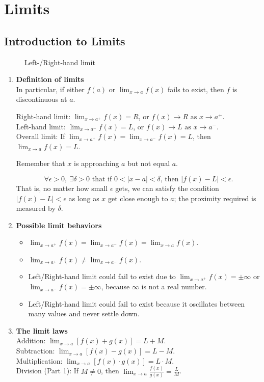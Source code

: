%
\chapter{Limits}
\section{Introduction to Limits}
\begin{figure}[H]
  \centering
  \caption{Left-/Right-hand limit}
\end{figure}
\begin{enumerate}
  \item \textbf{Definition of limits}\\
    \indent In particular, if either \(f(a)\) or \(\lim_{x\to a} f(x)\) fails to exist, then \(f\) is discontinuous at \(a\).\par
    \indent Right-hand limit: \(\lim_{x\to a^+}f(x)=R\), or \(f(x)\to R\text{ as }x\to a^+\).\\
    \indent Left-hand limit: \(\lim_{x\to a^-}f(x)=L\), or \(f(x)\to L\text{ as }x\to a^-\).\\
    \indent Overall limit: If \(\lim_{x\to a^+}f(x)=\lim_{x\to a^-}f(x)=L\), then \(\lim_{x\to a}f(x)=L\).\par
    Remember that \(x\) is approaching \(a\) but not equal \(a\).
    \begin{definition}
    \[
      \forall\epsilon>0,\ \exists\delta>0\text{ that if }0<\lvert x-a\rvert<\delta\text{, then }\lvert f(x)-L\rvert<\epsilon.
    \]
    That is, no matter how small \(\epsilon\) gets, we can satisfy the condition \(\lvert f(x)-L\rvert<\epsilon\) as long as \(x\) get close enough to \(a\); the proximity required is measured by \(\delta\).
    \end{definition}
  \item \textbf{Possible limit behaviors}
    \begin{itemize}
      \item \(\lim_{x\to a^+}f(x)=\lim_{x\to a^-}f(x)=\lim_{x\to a}f(x)\).
      \item \(\lim_{x\to a^+}f(x)\neq\lim_{x\to a^-}f(x)\).
      \item Left\slash Right-hand limit could fail to exist due to \(\lim_{x\to a^+}f(x)=\pm\infty\) or \(\lim_{x\to a^-}f(x)=\pm\infty\), because \(\infty\) is not a real number.
      \item Left\slash Right-hand limit could fail to exist because it oscillates between many values and never settle down.
    \end{itemize}
  \item \textbf{The limit laws}\\
    \indent Addition: \(\lim_{x\to a}[f(x)+g(x)]=L+M\).\\
    \indent Subtraction: \(\lim_{x\to a}[f(x)-g(x)]=L-M.\)\\
    \indent Multiplication: \(\lim_{x\to a}[f(x)\cdot g(x)]=L\cdot M\).\\
    \indent Division (Part 1): If \(M\neq 0\), then \(\lim_{x\to a}\frac{f(x)}{g(x)}=\frac{L}{M}\).
\end{enumerate}

